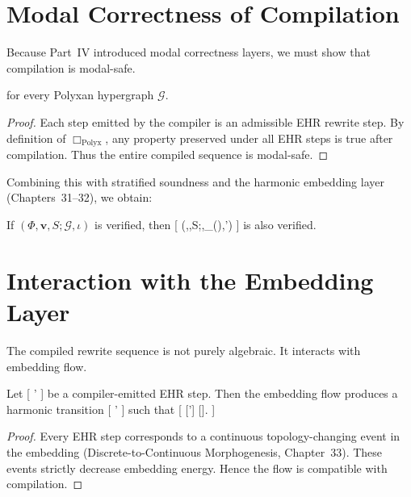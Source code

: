 \section{Modal Correctness of Compilation}

Because Part~IV introduced modal correctness layers, we must show that compilation is modal-safe.

\begin{theorem}
for every Polyxan hypergraph $\mathcal{G}$.
\end{theorem}

\begin{proof}
Each step emitted by the compiler is an admissible EHR rewrite step.
By definition of $\Box_{\mathrm{Polyx}}$, any property preserved under all EHR steps is true after compilation.
Thus the entire compiled sequence is modal-safe.
\end{proof}

Combining this with stratified soundness and the harmonic embedding layer (Chapters~31--32), we obtain:

\begin{corollary}
If $(\Phi,\mathbf{v},S;\mathcal{G},\iota)$ is verified, then
[
(\Phi,,S;,_{}(),\iota')
]
is also verified.
\end{corollary}

\section{Interaction with the Embedding Layer}

The compiled rewrite sequence is not purely algebraic.
It interacts with embedding flow.

\begin{theorem}
Let
[
 \to {}'
]
be a compiler-emitted EHR step.
Then the embedding flow produces a harmonic transition
[
\iota \to \iota'
]
such that
[
[\iota'] \le {}[\iota].
]
\end{theorem}

\begin{proof}
Every EHR step corresponds to a continuous topology-changing event in the embedding (Discrete-to-Continuous Morphogenesis, Chapter~33).
These events strictly decrease embedding energy.
Hence the flow is compatible with compilation.
\end{proof}

